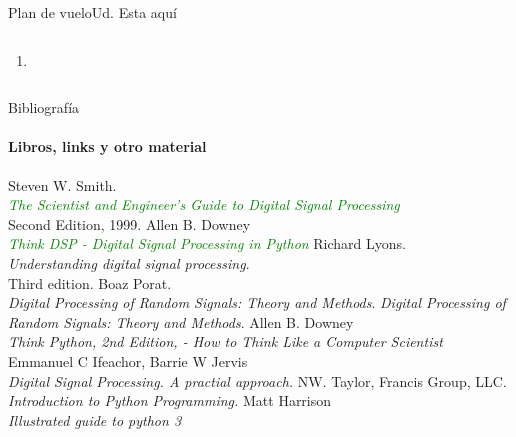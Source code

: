 \begin{frame}{Plan de vuelo}{Ud. Esta aquí}
\begin{columns}[onlytextwidth]
\begin{enumerate}
{\begin{itemize}
{                      }
                \end{itemize}
             }
          \item{
             }
       \end{enumerate}
    \end{columns}
 \end{frame}
 \begin{frame}{Bibliografía}
    \framesubtitle{Libros, links y otro material}
    \tiny{
       \begin{thebibliography}{1}
             Steven W. Smith. \\
             \textcolor{green}{\emph{The Scientist and Engineer's Guide to Digital Signal Processing}} \\
             Second Edition, 1999.
             Allen B. Downey \\
             \textcolor{green}{\emph{Think DSP - Digital Signal Processing in Python}}
             Richard Lyons. \\
             \emph {Understanding digital signal processing}. \\
             Third edition.
             Boaz Porat. \\
            \emph{Digital Processing of Random Signals: Theory and Methods}.
             \emph{Digital Processing of Random Signals: Theory and Methods}.
             Allen B. Downey \\
             \emph{ Think Python, 2nd Edition, - How to Think Like a Computer Scientist}
             Emmanuel C Ifeachor, Barrie W Jervis \\
             \emph{ Digital Signal Processing. A practial approach.}
             NW. Taylor, Francis Group, LLC.\\
             \emph{ Introduction to Python Programming.}
             Matt Harrison\\
             \emph{ Illustrated guide to python 3}
       \end{thebibliography}
   }
\end{frame}
